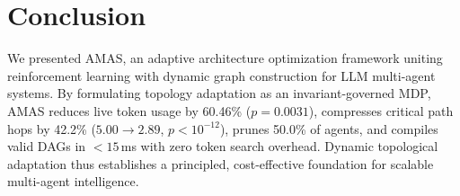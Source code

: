 \documentclass[conference]{IEEEtran}
\begin{document}
\section{Conclusion}
\label{sec:conclusion}
We presented AMAS, an adaptive architecture optimization framework uniting reinforcement learning with dynamic graph construction for LLM multi-agent systems. By formulating topology adaptation as an invariant-governed MDP, AMAS reduces live token usage by 60.46\% ($p = 0.0031$), compresses critical path hops by 42.2\% ($5.00 \to 2.89$, $p < 10^{-12}$), prunes 50.0\% of agents, and compiles valid DAGs in $<15$\,ms with zero token search overhead. Dynamic topological adaptation thus establishes a principled, cost-effective foundation for scalable multi-agent intelligence.



\end{document}
